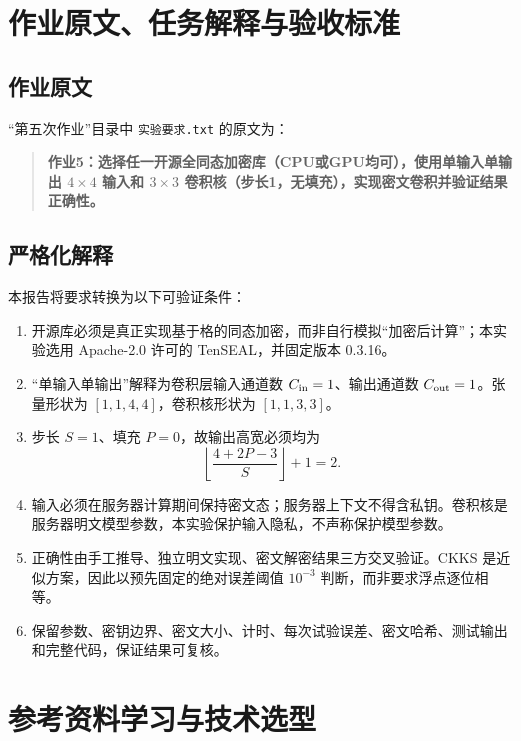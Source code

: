 \documentclass[UTF8,a4paper,zihao=-4]{ctexart}
\begin{document}
\tableofcontents
\clearpage
{}

\section{作业原文、任务解释与验收标准}

\subsection{作业原文}

“第五次作业”目录中 \texttt{实验要求.txt} 的原文为：

\begin{quote}
\textbf{作业5：选择任一开源全同态加密库（CPU或GPU均可），使用单输入单输出 $4\times4$ 输入和 $3\times3$ 卷积核（步长1，无填充），实现密文卷积并验证结果正确性。}
\end{quote}

\subsection{严格化解释}

本报告将要求转换为以下可验证条件：

\begin{enumerate}
  \item 开源库必须是真正实现基于格的同态加密，而非自行模拟“加密后计算”；本实验选用 Apache-2.0 许可的 TenSEAL，并固定版本 0.3.16。
  \item “单输入单输出”解释为卷积层输入通道数 $C_{\rm in}=1$、输出通道数 $C_{\rm out}=1$。张量形状为 $[1,1,4,4]$，卷积核形状为 $[1,1,3,3]$。
  \item 步长 $S=1$、填充 $P=0$，故输出高宽必须均为
  \[
    \left\lfloor\frac{4+2P-3}{S}\right\rfloor+1=2.
  \]
  \item 输入必须在服务器计算期间保持密文态；服务器上下文不得含私钥。卷积核是服务器明文模型参数，本实验保护输入隐私，不声称保护模型参数。
  \item 正确性由手工推导、独立明文实现、密文解密结果三方交叉验证。CKKS 是近似方案，因此以预先固定的绝对误差阈值 $10^{-3}$ 判断，而非要求浮点逐位相等。
  \item 保留参数、密钥边界、密文大小、计时、每次试验误差、密文哈希、测试输出和完整代码，保证结果可复核。
\end{enumerate}

\section{参考资料学习与技术选型}
\end{document}
